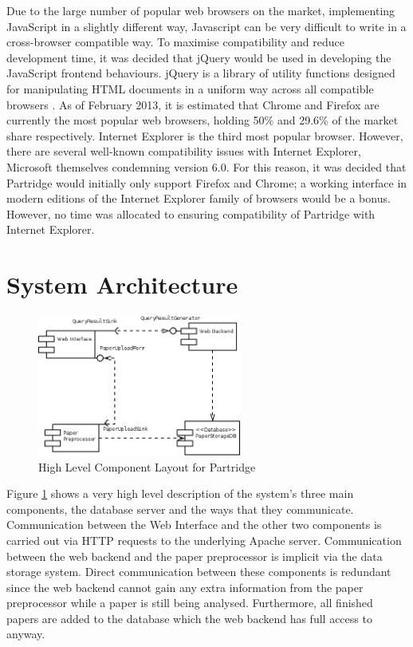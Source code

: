 Due to the large number of popular web browsers on the market, implementing
JavaScript in a slightly different way, Javascript can be very difficult to
write in a cross-browser compatible way. To maximise compatibility and reduce
development time, it was decided that jQuery would be used in developing the
JavaScript frontend behaviours. jQuery is a library of utility functions
designed for manipulating HTML documents in a uniform way across all compatible
browsers \cite{jquery2013}. As of February 2013, it is estimated that Chrome
and Firefox are currently the most popular web browsers, holding 50\% and
29.6\% of the market share respectively\cite{browserstats2013}. Internet
Explorer is the third most popular browser. However, there are several
well-known compatibility issues with Internet Explorer, Microsoft themselves
condemning version 6.0\cite{ie6death}. For this reason, it was decided that
Partridge would initially only support Firefox and Chrome; a working interface
in modern editions of the Internet Explorer family of browsers would be a
bonus.  However, no time was allocated to ensuring compatibility of Partridge
with Internet Explorer.

\section{ System Architecture }


\begin{figure}[!ht]
\center
\includegraphics[width=0.6\textwidth]{images/design/components_high_level.png}
\caption{High Level Component Layout for Partridge}
\label{fig:high_level_components}
\end{figure}

Figure \ref{fig:high_level_components} shows a very high level description of
the system's three main components, the database server and the ways that they
communicate. Communication between the Web Interface and the other two
components is carried out via HTTP requests to the underlying Apache server.
Communication between the web backend and the paper preprocessor is implicit
via the data storage system. Direct communication between these components is
redundant since the web backend cannot gain any extra information from the
paper preprocessor while a paper is still being analysed. Furthermore, all finished
papers are added to the database which the web backend has full access to
anyway.



